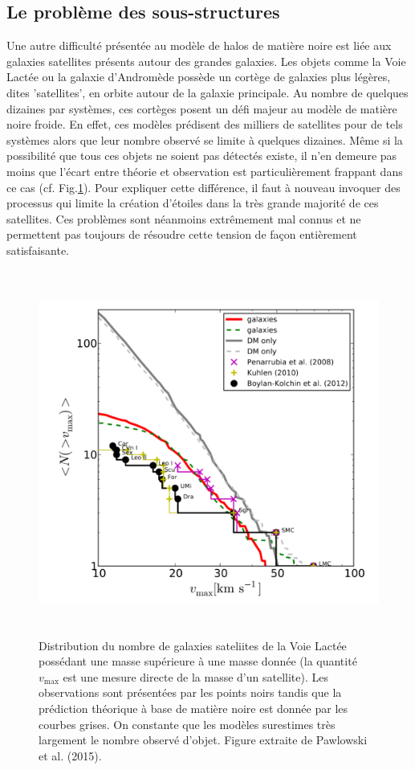 \subsection{Le problème des sous-structures}
Une autre difficulté présentée au modèle de halos de matière noire est liée aux galaxies satellites présents autour des grandes galaxies. Les objets comme la Voie Lactée ou la galaxie d'Andromède possède un cortège de galaxies plus légères, dites 'satellites', en orbite autour de la galaxie principale. Au nombre de quelques dizaines par systèmes, ces cortèges posent un défi majeur au modèle de matière noire froide. En effet, ces modèles prédisent des milliers de satellites pour de tels systèmes alors que leur nombre observé se limite à quelques dizaines. Même si la possibilité que tous ces objets ne soient pas détectés existe, il n'en demeure pas moins que l'écart entre théorie et observation est particulièrement frappant dans ce cas (cf. Fig.\ref{f:missing}). Pour expliquer cette différence, il faut à nouveau invoquer des processus qui limite la création d'étoiles dans la très grande majorité de ces satellites. Ces problèmes sont néanmoins extrêmement mal connus et ne permettent pas toujours de résoudre cette tension de façon entièrement satisfaisante.
\begin{figure}[htbp]
	\centering
		\includegraphics[height=12cm]{figs/missing.png}
	\caption{Distribution du nombre de galaxies sateliites de la Voie Lactée possédant une masse supérieure à une masse donnée (la quantité $v_\mathrm{max}$ est une mesure directe de la masse d'un satellite). Les observations sont présentées par les points noirs tandis que la prédiction théorique à base de matière noire est donnée par les courbes grises. On constante que les modèles surestimes très largement le nombre observé d'objet. Figure extraite de Pawlowski et al. (2015). } 
	\label{f:missing}
\end{figure}

